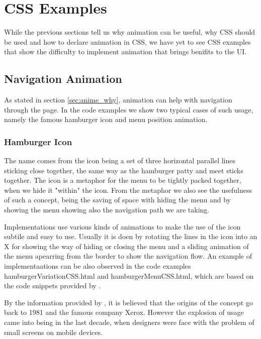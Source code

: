 \section{CSS Examples} %
\label{sec:CSS_Examples}

While the previous sections tell us why animation can be useful, why CSS should 
be used and how to declare animation in CSS, we have yet to see CSS examples 
that show the difficulty to implement animation that brings benifits to the UI.

\subsection{Navigation Animation} %
\label{sub:navigationCSS}

As stated in section \ref{sec:anime_why}, animation can help with navigation 
through the page. In the code examples we show two typical cases of such usage, 
namely the famous hamburger icon and menu position animation.

\subsubsection{Hamburger Icon} %
\label{subsub:hamburger}

The name comes from the icon being a set of three horizontal parallel lines 
sticking close together, the same way as the hamburger patty and meet sticks 
together. The icon is a metaphor for the menu to be tightly packed together, 
when we hide it "within" the icon. From the metaphor we also see the usefulness 
of such a concept, being the saving of space with hiding the menu and by 
showing the menu showing also the navigation path we are taking.

Implementations use various kinds of animations to make the use of the icon 
subtile and easy to use. Usually it is doen by rotating the lines in the icon 
into an X for showing the way of hiding or closing the menu and a sliding 
animation of the menu apearring from the border to show the navigation flow. An 
example of implementaations can be also observed in the code examples 
hamburgerVariationCSS.html and hamburgerMenuCSS.html, which are based on the 
code snippets provided by \citet{hamburgerMenu,hamburgerVar}.

By the information provided by \citet{vtldesign}, it is believed that the 
origins of the concept go back to 1981 and the famous company Xerox. However 
the explosion of usage came into being in the last decade, when designers were 
face with the problem of small screens on mobile devices.

